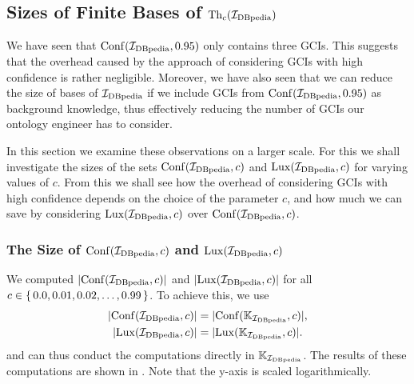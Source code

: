 \subsection{Sizes of Finite Bases of $\operatorname{Th}_c({\mathcal{I}_{\text{DBpedia}}})$}
\label{sec:sizes-finite-bases}

We have seen that $\operatorname{Conf}({\mathcal{I}_{\text{DBpedia}}}, 0.95)$ only contains three GCIs.  This suggests that
the overhead caused by the approach of considering GCIs with high confidence is rather
negligible.  Moreover, we have also seen that we can reduce the size of bases of
${\mathcal{I}_{\text{DBpedia}}}$ if we include GCIs from $\operatorname{Conf}({\mathcal{I}_{\text{DBpedia}}}, 0.95)$ as background knowledge, thus
effectively reducing the number of GCIs our ontology engineer has to consider.

In this section we examine these observations on a larger scale.  For this we shall
investigate the sizes of the sets $\operatorname{Conf}({\mathcal{I}_{\text{DBpedia}}}, c)$ and $\operatorname{Lux}({\mathcal{I}_{\text{DBpedia}}}, c)$ for
varying values of $c$.  From this we shall see how the overhead of considering GCIs with
high confidence depends on the choice of the parameter $c$, and how much we can save by
considering $\operatorname{Lux}({\mathcal{I}_{\text{DBpedia}}}, c)$ over $\operatorname{Conf}({\mathcal{I}_{\text{DBpedia}}}, c)$.

\subsubsection{The Size of $\operatorname{Conf}({\mathcal{I}_{\text{DBpedia}}},c)$ and $\operatorname{Lux}({\mathcal{I}_{\text{DBpedia}}}, c)$}
\label{sec:size-confidbpedia-c}

We computed $\lvert \operatorname{Conf}({\mathcal{I}_{\text{DBpedia}}}, c) \rvert$ and $\lvert \operatorname{Lux}({\mathcal{I}_{\text{DBpedia}}}, c) \rvert$ for all $c \in
{\ensuremath{\{\, 0.0, 0.01, 0.02, \dots, 0.99 \,\}}}$.  To achieve this, we use
\begin{align*}
  \lvert \operatorname{Conf}({\mathcal{I}_{\text{DBpedia}}}, c) \rvert &= \lvert \operatorname{Conf}({\mathbb{K}}_{\mathcal{I}_{\text{DBpedia}}}, c) \rvert, \\
  \lvert \operatorname{Lux}({\mathcal{I}_{\text{DBpedia}}}, c) \rvert &= \lvert \operatorname{Lux}({\mathbb{K}}_{\mathcal{I}_{\text{DBpedia}}}, c) \rvert.
\end{align*}
and can thus conduct the computations directly in ${\mathbb{K}}_{\mathcal{I}_{\text{DBpedia}}}$.  The results of
these computations are shown in .  Note that the y-axis is
scaled logarithmically.

